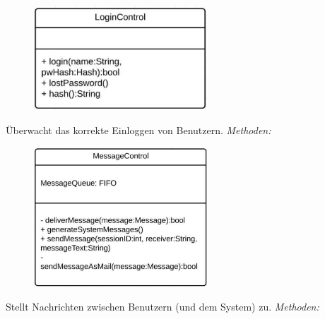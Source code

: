 \begin{itemize}
\begin{itemize}
                    \begin{figure}[htb]
                    \centering
                    \includegraphics[width=6.5cm]{Diagramms/class/singleclass/ControlLogin.pdf}
                    \end{figure}
                    \newline
                        Überwacht das korrekte Einloggen von Benutzern.
                                                           \newline
                    \emph{Methoden:}
                        \begin{itemize}
                        \end{itemize}

                    \begin{figure}[htb]
                    \centering
                    \includegraphics[width=6.5cm]{Diagramms/class/singleclass/ControlMessage.pdf}
                    \end{figure}
                    \newline
                        Stellt Nachrichten zwischen Benutzern (und dem System) zu.
                    \newline
                    \emph{Methoden:}
                        \begin{itemize}
                        \end{itemize}


\end{itemize}
\end{itemize}
